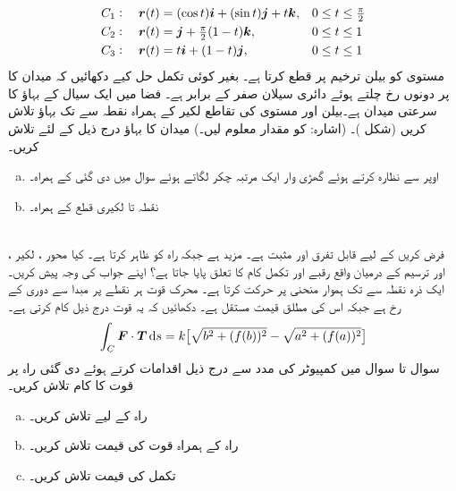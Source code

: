 \begin{align*}
C_1:\quad {\ensuremath{{\boldsymbol{r}}}}(t)&=(\cos t){\boldsymbol{i}}+(\sin t){\boldsymbol{j}}+t{\boldsymbol{k}},&& 0\le t\le \tfrac{\pi}{2}\\
C_2:\quad {\ensuremath{{\boldsymbol{r}}}}(t)&={\boldsymbol{j}}+\tfrac{\pi}{2}(1-t){\boldsymbol{k}},&& 0\le t\le 1\\
C_3:\quad {\ensuremath{{\boldsymbol{r}}}}(t)&=t{\boldsymbol{i}}+(1-t){\boldsymbol{j}},&& 0\le t\le 1
\end{align*}
مستوی  کو  بیلن   ترخیم  پر قطع کرتا ہے۔ بغیر کوئی تکمل  حل کیے   دکھائیں کہ میدان  کا  پر دونوں رخ چلتے ہوئے دائری سیلان صفر کے برابر ہے۔
فضا میں ایک سیال کے بہاؤ کا سرعتی میدان  ہے۔بیلن  اور مستوی  کی تقاطع لکیر کے ہمراہ نقطہ  سے  تک  بہاؤ تلاش کریں (شکل )۔ (اشارہ:  کو مقدار معلوم لیں۔)
میدان  کا بہاؤ درج ذیل کے لئے  تلاش کریں۔
\begin{enumerate}[a.]
\item
اوپر سے نظارہ کرتے ہوئے  گھڑی وار ایک  مرتبہ چکر لگاتے ہوئے سوال  میں دی گئی  کے ہمراہ۔
\item
نقطہ  تا  لکیری قطع کے ہمراہ۔

\end{enumerate}
\\
فرض کریں   کے لیے  قابل تفرق اور مثبت ہے۔ مزید  ہے جبکہ  راہ    کو  ظاہر کرتا ہے۔ کیا محور ، لکیر ،  اور ترسیم  کے درمیان واقع رقبے  اور  تکمل کام   کا   تعلق  پایا جاتا ہے؟ اپنے جواب کی وجہ پیش کریں۔
ایک ذرہ نقطہ  سے  تک ہموار منحنی  پر حرکت کرتا ہے۔ محرک قوت ہر نقطے  پر مبدا سے دوری کے رخ ہے  جبکہ اس کی مطلق قیمت  مستقل  ہے۔ دکھائیں کہ یہ قوت درج ذیل کام کرتی ہے۔
\[\int_C\kvec{F}\cdot \kvec{T}\dif s=k\big[\sqrt{b^2+(f(b))^2}-\sqrt{a^2+(f(a))^2}\big]\]  
سوال  تا سوال  میں کمپیوٹر کی مدد سے درج ذیل اقدامات  کرتے ہوئے دی گئی راہ پر قوت  کا کام تلاش کریں۔
\begin{enumerate}[a.]
\item
راہ  کے لیے  تلاش کریں۔
\item
راہ کے ہمراہ  قوت  کی قیمت تلاش کریں۔
\item
تکمل  کی قیمت تلاش کریں۔
\end{enumerate}


